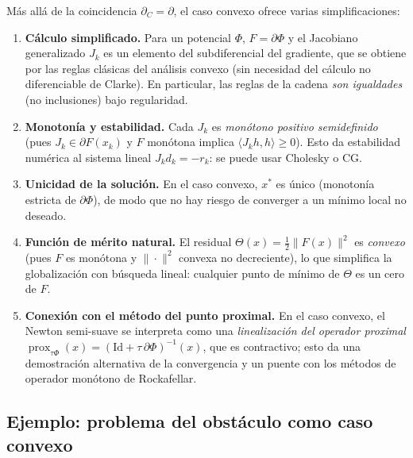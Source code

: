 \documentclass[12pt]{book}
\newcommand{\prox}{\operatorname{prox}}
\newcommand{\Id}{\mathrm{Id}}
\newcommand{\subdiffC}{\partial_C}
\newcommand{\subdiffR}{\partial}
\theoremstyle{definition}
\theoremstyle{plain}
\theoremstyle{remark}
\begin{document}
Más allá de la coincidencia $\subdiffC=\subdiffR$, el caso convexo
ofrece varias simplificaciones:

\begin{enumerate}[leftmargin=1.4em,itemsep=3pt]
  \item \textbf{Cálculo simplificado.}  Para un potencial $\Phi$,
        $F=\subdiffR\Phi$ y el Jacobiano generalizado $J_k$ es un
        elemento del subdiferencial del gradiente, que se obtiene por
        las reglas clásicas del análisis convexo (sin necesidad del
        cálculo no diferenciable de Clarke).  En particular, las
        reglas de la cadena \emph{son igualdades} (no inclusiones)
        bajo regularidad.
  \item \textbf{Monotonía y estabilidad.}  Cada $J_k$ es
        \emph{monótono positivo semidefinido} (pues
        $J_k\in\subdiffR F(x_k)$ y $F$ monótona implica
        $\langle J_k h,h\rangle\ge0$).  Esto da estabilidad numérica
        al sistema lineal $J_k d_k=-r_k$: se puede usar
        Cholesky o CG.
  \item \textbf{Unicidad de la solución.}  En el caso convexo, $x^*$
        es único (monotonía estricta de $\subdiffR\Phi$), de modo que
        no hay riesgo de converger a un mínimo local no deseado.
  \item \textbf{Función de mérito natural.}  El residual
        $\Theta(x)=\tfrac12\|F(x)\|^2$ es \emph{convexo} (pues $F$
        es monótona y $\|\cdot\|^2$ convexa no decreciente), lo que
        simplifica la globalización con búsqueda lineal: cualquier
        punto de mínimo de $\Theta$ es un cero de $F$.
  \item \textbf{Conexión con el método del punto proximal.}  En el
        caso convexo, el Newton semi-suave se interpreta como una
        \emph{linealización del operador proximal}
        $\prox_{\tau\Phi}(x)=(\Id+\tau\,\subdiffR\Phi)^{-1}(x)$, que
        es contractivo; esto da una demostración alternativa de la
        convergencia y un puente con los métodos de operador
        monótono de Rockafellar.
\end{enumerate}

\subsection{Ejemplo: problema del obstáculo como caso convexo}
\end{document}
